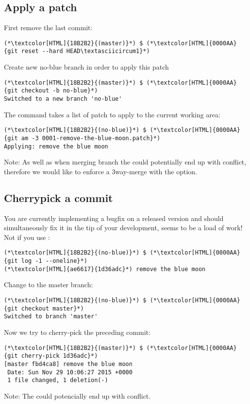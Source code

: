 \subsection{Apply a patch}
\begin{frame}[fragile]
    \subslidetitle
  First remove the last commit:
  \begin{lstlisting}
(*\textcolor[HTML]{18B2B2}{(master)}*) $ (*\textcolor[HTML]{0000AA}{git reset --hard HEAD\textasciicircum1}*)
\end{lstlisting}
  Create new no-blue branch in order to apply this patch
  \begin{lstlisting}
(*\textcolor[HTML]{18B2B2}{(master)}*) $ (*\textcolor[HTML]{0000AA}{git checkout -b no-blue}*)
Switched to a new branch 'no-blue'
\end{lstlisting}

  The  command takes a list of patch to apply to the current working area:
  \begin{lstlisting}
(*\textcolor[HTML]{18B2B2}{(no-blue)}*) $ (*\textcolor[HTML]{0000AA}{git am -3 0001-remove-the-blue-moon.patch}*)
Applying: remove the blue moon
\end{lstlisting}

  Note: As well as when merging branch the  could potentially end up with conflict, therefore we would like to enforce a 3way-merge with the  option.

\end{frame}

\subsection{Cherrypick a commit}
\begin{frame}[fragile]
    \subslidetitle
  You are currently implementing a bugfix on a released version and should simultaneously fix it in the tip of your development, seems to be a load of work! Not if you use :
  \begin{lstlisting}
(*\textcolor[HTML]{18B2B2}{(no-blue)}*) $ (*\textcolor[HTML]{0000AA}{git log -1 --oneline}*)
(*\textcolor[HTML]{ae6617}{1d36adc}*) remove the blue moon
\end{lstlisting}
  Change to the master branch:
  \begin{lstlisting}
(*\textcolor[HTML]{18B2B2}{(no-blue)}*) $ (*\textcolor[HTML]{0000AA}{git checkout master}*)
Switched to branch 'master'
\end{lstlisting}
  Now we try to cherry-pick the preceding commit:
  \begin{lstlisting}
(*\textcolor[HTML]{18B2B2}{(master)}*) $ (*\textcolor[HTML]{0000AA}{git cherry-pick 1d36adc}*)
[master fbd4ca8] remove the blue moon
 Date: Sun Nov 29 10:06:27 2015 +0000
 1 file changed, 1 deletion(-)
\end{lstlisting}
  Note:  The  could potencially end up with conflict.
\end{frame}


